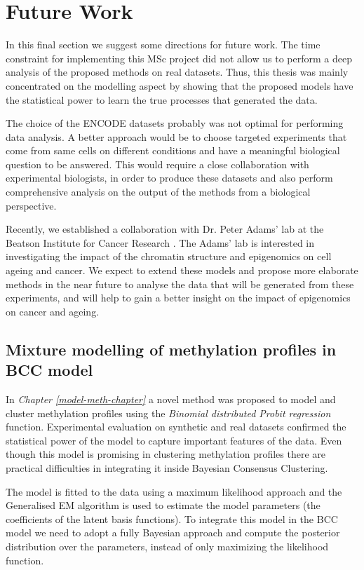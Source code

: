\section{Future Work} \label{future-work-sect}
In this final section we suggest some directions for future work. The time constraint for implementing this MSc project did not allow us to perform a deep analysis of the proposed methods on real datasets. Thus, this thesis was mainly concentrated on the modelling aspect by showing that the proposed models have the statistical power to learn the true processes that generated the data.

The choice of the ENCODE datasets probably was not optimal for performing data analysis. A better approach would be to choose targeted experiments that come from same cells on different conditions and have a meaningful biological question to be answered. This would require a close collaboration with experimental biologists, in order to produce these datasets and also perform comprehensive analysis on the output of the methods from a biological perspective. 

Recently, we established a collaboration with Dr. Peter Adams' lab at the Beatson Institute for Cancer Research \citep{Adams2015}. The Adams' lab is interested in investigating the impact of the chromatin structure and epigenomics on cell ageing and cancer. We expect to extend these models and propose more elaborate methods in the near future to analyse the data that will be generated from these experiments, and will help to gain a better insight on the impact of epigenomics on cancer and ageing.     

\subsection{Mixture modelling of methylation profiles in BCC model}
In \emph{Chapter \ref{model-meth-chapter}} a novel method was proposed to model and cluster methylation profiles using the \emph{Binomial distributed Probit regression} function. Experimental evaluation on synthetic and real datasets confirmed the statistical power of the model to capture important features of the data. Even though this model is promising in clustering methylation profiles there are practical difficulties in integrating it inside Bayesian Consensus Clustering. 

The model is fitted to the data using a maximum likelihood approach and the Generalised EM algorithm is used to estimate the model parameters (\ie the coefficients of the latent basis functions). To integrate this model in the BCC model we need to adopt a fully Bayesian approach and compute the posterior distribution over the parameters, instead of only maximizing the likelihood function.

